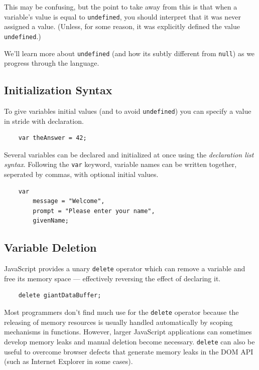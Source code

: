 \documentclass[11pt,letter]{book}
\begin{document}
    This may be confusing, but the point to take away from this is that when a variable's value is
    equal to \texttt{undefined}, you should interpret that it was never assigned a value. (Unless, 
    for some reason, it was explicitly defined the value \texttt{undefined}.)
    
    We'll learn more about \texttt{undefined} (and how its subtly different from \texttt{null}) as 
    we progress through the language.
    
    \subsection{Initialization Syntax}
    To give variables initial values (and to avoid \texttt{undefined}) you can specify a value in 
    stride with declaration.
    
    \begin{verbatim}
    var theAnswer = 42;
    \end{verbatim}
    
    Several variables can be declared and initialized at once using the \emph{declaration list 
    syntax}. Following the \texttt{var} keyword, variable names can be written together, seperated 
    by commas, with optional initial values.
    
    \begin{verbatim}
    var 
        message = "Welcome",
        prompt = "Please enter your name",
        givenName;
    \end{verbatim}
    
    \subsection{Variable Deletion}
    JavaScript provides a unary \texttt{delete} operator which can remove a variable and free its 
    memory space --- effectively reversing the effect of declaring it.
    
    \begin{verbatim}
    delete giantDataBuffer;
    \end{verbatim}
    
    Most programmers don't find much use for the \texttt{delete} operator because the releasing of 
    memory resources is usually handled automatically by scoping mechanisms in functions. However, 
    larger JavaScript applications can sometimes develop memory leaks and manual deletion become 
    necessary. \texttt{delete} can also be useful to overcome browser defects that generate memory 
    leaks in the DOM API (such as Internet Explorer in some cases).
    
    
    
    
    
    
    
    
\end{document}
